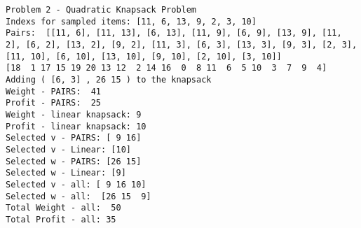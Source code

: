\documentclass[11pt]{article}
\begin{document}
    \begin{Verbatim}[commandchars=\\\{\}]
Problem 2 - Quadratic Knapsack Problem 
Indexs for sampled items: [11, 6, 13, 9, 2, 3, 10]
Pairs:  [[11, 6], [11, 13], [6, 13], [11, 9], [6, 9], [13, 9], [11, 2], [6, 2], [13, 2], [9, 2], [11, 3], [6, 3], [13, 3], [9, 3], [2, 3], [11, 10], [6, 10], [13, 10], [9, 10], [2, 10], [3, 10]]
[18  1 17 15 19 20 13 12  2 14 16  0  8 11  6  5 10  3  7  9  4]
Adding ( [6, 3] , 26 15 ) to the knapsack
Weight - PAIRS:  41
Profit - PAIRS:  25
Weight - linear knapsack: 9
Profit - linear knapsack: 10
Selected v - PAIRS: [ 9 16]
Selected v - Linear: [10]
Selected w - PAIRS: [26 15]
Selected w - Linear: [9]
Selected v - all: [ 9 16 10]
Selected w - all:  [26 15  9]
Total Weight - all:  50
Total Profit - all: 35

    \end{Verbatim}


    
    
    
    
\end{document}
